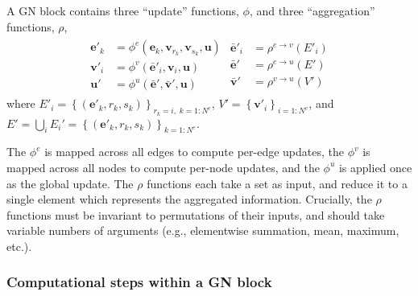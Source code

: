 \documentclass[10pt, onecolumn]{article}
\newcommand{\uv}{\mathbf{u}}    %
\newcommand{\ev}{\mathbf{e}}    %
\newcommand{\vv}{\mathbf{v}}    %
\begin{document}
A GN block contains three ``update'' functions, $\phi$, and three ``aggregation'' functions, $\rho$,
\begin{align}
  \begin{split}
    \ev'_k &= \phi^e\left(\ev_k, \vv_{r_k}, \vv_{s_k}, \uv \right) \\
    \vv'_i &= \phi^v\left(\mathbf{\bar{e}}'_i, \vv_i, \uv \right) \\
    \uv' &= \phi^u\left(\mathbf{\bar{e}}', \mathbf{\bar{v}}', \uv \right)
  \end{split}
  \begin{split}
    \mathbf{\bar{e}}'_i &= \rho^{e \rightarrow v}\left(E'_i\right) \\
    \mathbf{\bar{e}}' &= \rho^{e \rightarrow u}\left(E'\right) \\
    \mathbf{\bar{v}}' &= \rho^{v \rightarrow u}\left(V'\right)   
  \end{split}
  \label{eq:gn-functions}
\end{align}
where $E'_i = \left\{\left(\ev'_k, r_k, s_k \right)\right\}_{r_k=i,\; k=1:N^e}$, $V'=\left\{\vv'_i\right\}_{i=1:N^v}$, and $E' = \bigcup_i E_i' = \left\{\left(\ev'_k, r_k, s_k \right)\right\}_{k=1:N^e}$.

The $\phi^e$ is mapped across all edges to compute per-edge updates, the $\phi^v$ is mapped across all nodes to compute per-node updates, and the $\phi^u$ is applied once as the global update.
%
The $\rho$ functions each take a set as input, and reduce it to a single element which represents the aggregated information. Crucially, the $\rho$ functions must be invariant to permutations of their inputs, and should take variable numbers of arguments (e.g., elementwise summation, mean, maximum, etc.).

\subsubsection{Computational steps within a GN block}
\end{document}
